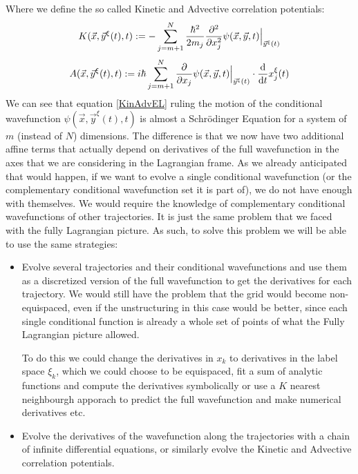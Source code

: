 \documentclass[11pt, a4paper]{article} %
\begin{document}
Where we define the so called Kinetic and Advective correlation potentials:
\begin{equation}\label{KinEL}
K(\vec{x}, \vec{y}^\xi(t),t):=-\sum_{j=m+1}^N \frac{\hbar^2}{2m_j}\pdv[2]{}{x_j} \psi(\vec{x}, \vec{y},t)\Big\rvert_{\vec{y}^\xi(t)}
\end{equation}
\begin{equation}\label{AdvEL}
A(\vec{x}, \vec{y}^\xi(t),t):=i\hbar\sum_{j=m+1}^N \pdv{}{x_j}\psi(\vec{x}, \vec{y},t)\Big\rvert_{\vec{y}^\xi(t)}\cdot \dv{}{t}x^\xi_j(t)
\end{equation}
We can see that equation \eqref{KinAdvEL} ruling the motion of the conditional wavefunction $\psi(\vec{x}, \vec{y}^\xi(t),t)$ is almost a Schrödinger Equation for a system of $m$ (instead of $N$) dimensions. The difference is that we now have two additional affine terms that actually depend on derivatives of the full wavefunction in the axes that we are considering in the Lagrangian frame. As we already anticipated that would happen, if we want to evolve a single conditional wavefunction (or the complementary conditional wavefunction set it is part of), we do not have enough with themselves. We would require the knowledge of complementary conditional wavefunctions of other trajectories. It is just the same problem that we faced with the fully Lagrangian picture. As such, to solve this problem we will be able to use the same strategies: 
\begin{itemize}
\item Evolve several trajectories and their conditional wavefunctions and use them as a discretized version of the full wavefunction to get the derivatives for each trajectory. We would still have the problem that the grid would become non-equispaced, even if the unstructuring in this case would be better, since each single conditional function is already a whole set of points of what the Fully Lagrangian picture allowed.

To do this we could change the derivatives in $x_k$ to derivatives in the label space $\xi_k$, which we could choose to be equispaced, fit a sum of analytic functions and compute the derivatives symbolically or use a $K$ nearest neighbourgh apporach to predict the full wavefunction and make numerical derivatives etc.

\item Evolve the derivatives of the wavefunction along the trajectories with a chain of infinite differential equations, or similarly evolve the Kinetic and Advective correlation potentials.
\end{itemize}
\end{document}
